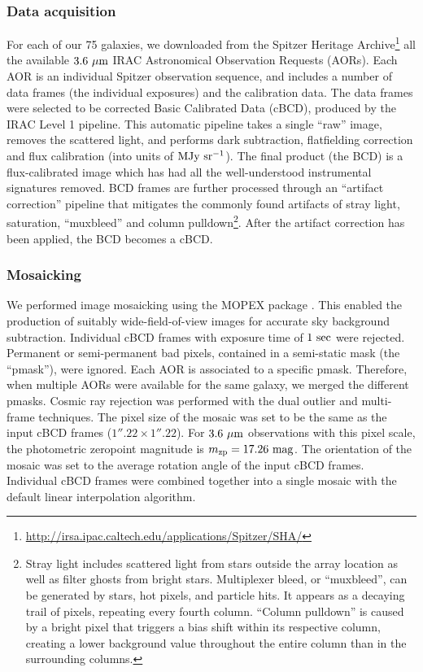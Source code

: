 \documentclass[preprint2]{emulateapj}
\begin{document}
\subsubsection{Data acquisition}
For each of our 75 galaxies, we downloaded from the 
Spitzer Heritage Archive\footnote{\url{http://irsa.ipac.caltech.edu/applications/Spitzer/SHA/}} 
all the available $3.6~\rm \mu m$ IRAC Astronomical Observation Requests (AORs). 
Each AOR is an individual Spitzer observation sequence, and
includes a number of data frames (the individual exposures) and the calibration data.
The data frames were selected to be 
corrected Basic Calibrated Data (cBCD), produced by the IRAC Level 1 pipeline. 
This automatic pipeline takes a single ``raw'' image, removes the scattered light, 
and performs dark subtraction, flatfielding correction and flux calibration (into units of $\rm MJy~sr^{-1}$). 
The final product (the BCD) is a flux-calibrated image which has had all the well-understood instrumental signatures removed.
BCD frames are further processed through an ``artifact correction'' pipeline 
that mitigates the commonly found artifacts of stray light, saturation, ``muxbleed'' and column pulldown\footnote{Stray light 
includes scattered light from stars outside the array location as well as filter ghosts from bright stars. 
Multiplexer bleed, or ``muxbleed'', can be generated by stars, hot pixels, and particle hits.
It appears as a decaying trail of pixels, repeating every fourth column.
``Column pulldown'' is caused by a bright pixel that triggers a bias shift within its respective column, 
creating a lower background value throughout the entire column than in the surrounding columns.}.
After the artifact correction has been applied, the BCD becomes a cBCD.

\subsubsection{Mosaicking}
We performed image mosaicking using the MOPEX package \citep{makovozmarleau2005mopex}.
This enabled the production of suitably wide-field-of-view images for accurate sky background subtraction.
Individual cBCD frames with exposure time of $1~\rm sec$ were rejected.
Permanent or semi-permanent bad pixels, contained in a semi-static mask (the ``pmask''), were ignored.
Each AOR is associated to a specific pmask. 
Therefore, when multiple AORs were available for the same galaxy, 
we merged the different pmasks. 
Cosmic ray rejection was performed with the dual outlier and multi-frame techniques.
The pixel size of the mosaic was set to be the same as the input cBCD frames ($1''.22 \times 1''.22$).
For $3.6~\rm \mu m$ observations with this pixel scale, 
the photometric zeropoint magnitude is $m_{\rm zp} = 17.26 \rm~mag$.
The orientation of the mosaic was set to the average rotation angle of the input cBCD frames. 
Individual cBCD frames were combined together into a single mosaic with the default linear interpolation algorithm.
\end{document}

